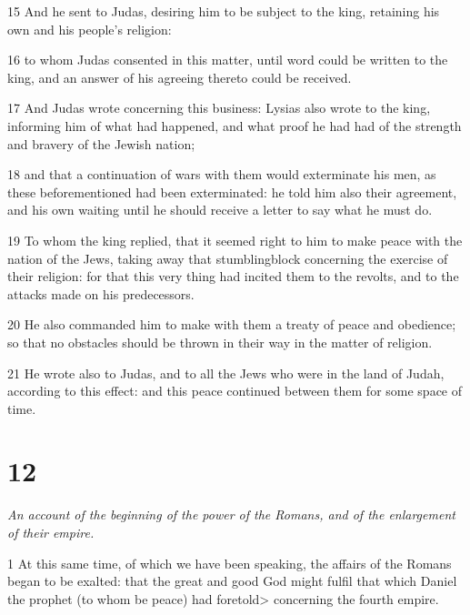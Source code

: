 \par 15 And he sent to Judas, desiring him to be subject to the king, retaining his own and his people’s religion: 

\par 16 to whom Judas consented in this matter, until word could be written to the king, and an answer of his agreeing thereto could be received. 

\par 17 And Judas wrote concerning this business: Lysias also wrote to the king, informing him of what had happened, and what proof he had had of the strength and bravery of the Jewish nation; 

\par 18 and that a continuation of wars with them would exterminate his men, as these beforementioned had been exterminated: he told him also their agreement, and his own waiting until he should receive a letter to say what he must do. 

\par 19 To whom the king replied, that it seemed right to him to make peace with the nation of the Jews, taking away that stumblingblock concerning the exercise of their religion: for that this very thing had incited them to the revolts, and to the attacks made on his predecessors. 

\par 20 He also commanded him to make with them a treaty of peace and obedience; so that no obstacles should be thrown in their way in the matter of religion. 

\par 21 He wrote also to Judas, and to all the Jews who were in the land of Judah, according to this effect: and this peace continued between them for some space of time. 


\chapter{12}

\par \textit{An account of the beginning of the power of the Romans, and of the enlargement of their empire.}

\par 1 At this same time, of which we have been speaking, the affairs of the Romans began to be exalted: that the great and good God might fulfil that which Daniel the prophet (to whom be peace) had foretold> concerning the fourth empire. 

